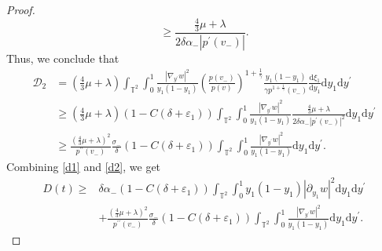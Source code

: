\documentclass[10pt,reqno]{amsart}
\numberwithin{equation}{section}
\newcommand{\dif}{\mathrm{d}}
\begin{document}
\begin{proof}
\[\ge \frac{\frac{4}{3}\mu+\lambda}{2\delta\alpha_-|p^{\prime}(v_-)|}.
\]
Thus, we conclude that
\begin{equation}\label{d2}
\begin{aligned}
\mathcal{D}_2&=(\frac{4}{3}\mu+\lambda)\int_{\mathbb{T}^2}\int_0^1
\frac{|\nabla_{y^\prime}w|^2}{y_1(1-y_1)}\left(\frac{p(v_-)}{p(v)}\right)^{1+\frac{1}{\gamma}}
\frac{y_1(1-y_1)}{\gamma p^{1+\frac{1}{\gamma}}(v_-)}\frac{\dif \xi_1}{\dif y_1}\dif y_1\dif y^{\prime}\\
&\ge(\frac{4}{3}\mu+\lambda)(1-C(\delta+\varepsilon_1))\int_{\mathbb{T}^2}\int_0^1
\frac{|\nabla_{y^\prime}w|^2}{y_1(1-y_1)}
\frac{\frac{4}{3}\mu+\lambda}{2\delta\alpha_-|p^{\prime}(v_-)|^2}
\dif y_1\dif y^{\prime}\\
&\ge\frac{(\frac{4}{3}\mu+\lambda)^2}{p^{\prime\prime}(v_-)}\frac{\sigma_-}{\delta} (1-C(\delta+\varepsilon_1))\int_{\mathbb{T}^2}\int_0^1
\frac{|\nabla_{y^\prime}w|^2}{y_1(1-y_1)}
\dif y_1\dif y^{\prime}.
\end{aligned}
\end{equation}
Combining \eqref{d1} and \eqref{d2}, we get
\begin{equation}\label{ddd}
\begin{aligned}
D(t)\ge&\delta\alpha_-(1-C(\delta+\varepsilon_1))\int_{\mathbb{T}^2}\int_0^1y_1(1-y_1)|\partial_{y_1}w|^2
\dif y_1\dif y^{\prime}\\
&+\frac{(\frac{4}{3}\mu+\lambda)^2}{p^{\prime\prime}(v_-)}\frac{\sigma_-}{\delta} (1-C(\delta+\varepsilon_1))\int_{\mathbb{T}^2}\int_0^1
\frac{|\nabla_{y^\prime}w|^2}{y_1(1-y_1)}
\dif y_1\dif y^{\prime}.
\end{aligned}
\end{equation}


\end{proof}
\end{document}
